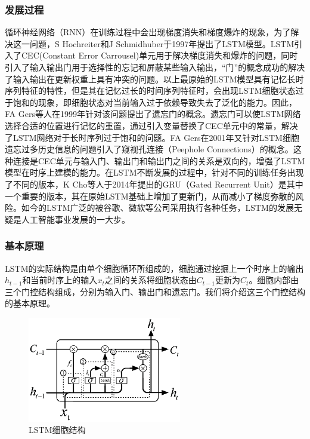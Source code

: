 \subsubsection{发展过程}
循环神经网络（RNN）在训练过程中会出现梯度消失和梯度爆炸的现象，为了解决这一问题，S Hochreiter和J Schmidhuber于1997年提出了LSTM模型\supercite{lstm}。LSTM引入了CEC(Constant Error Carrousel)单元用于解决梯度消失和爆炸的问题，同时引入了输入输出门用于选择性的忘记和屏蔽某些输入输出，“门”的概念成功的解决了输入输出在更新权重上具有冲突的问题。以上最原始的LSTM模型具有记忆长时序列特征的特性，但是其在记忆过长的时间序列特征时，会出现LSTM细胞状态过于饱和的现象，即细胞状态对当前输入过于依赖导致失去了泛化的能力。因此，FA Gers等人在1999年针对该问题提出了遗忘门的概念\supercite{lstmforgetgate}。遗忘门可以使LSTM网络选择合适的位置进行记忆的重置，通过引入变量替换了CEC单元中的常量，解决了LSTM网络对于长时序列过于饱和的问题。FA Gers在2001年又针对LSTM细胞遗忘过多历史信息的问题引入了窥视孔连接（Peephole Connections）的概念\supercite{lstmpeephole}。这种连接是CEC单元与输入门、输出门和输出门之间的关系是双向的，增强了LSTM模型在时序上建模的能力。在LSTM不断发展的过程中，针对不同的训练任务出现了不同的版本，K Cho等人于2014年提出的GRU（Gated Recurrent Unit）是其中一个重要的版本，其在原始LSTM基础上增加了更新门，从而减小了梯度弥散的风险。如今的LSTM广泛的被谷歌、微软等公司采用执行各种任务，LSTM的发展无疑是人工智能事业发展的一大步。

\subsubsection{基本原理}
LSTM的实际结构是由单个细胞循环所组成的，细胞通过挖掘上一个时序上的输出$h_{t-1}$和当前时序上的输入$x_t$之间的关系将细胞状态由$C_{t-1}$更新为$C_{t}$。细胞内部由三个门控结构组成，分别为输入门、输出门和遗忘门。我们将介绍这三个门控结构的基本原理。

\begin{figure}[thb]
\begin{center}
\includegraphics[width=0.6\textwidth]{figures/lstm.eps}
\caption{LSTM细胞结构}\label{fig:lstm}
\end{center}
\end{figure}

